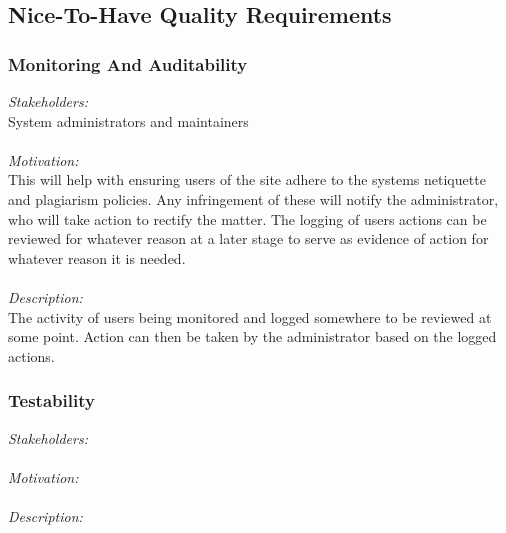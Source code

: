 \documentclass[a4paper,12pt]{report}
\begin{document}
	\subsection{Nice-To-Have Quality Requirements}
		\subsubsection{Monitoring And Auditability}
		\emph{Stakeholders: }\\ System administrators and maintainers\\
		\\\emph{Motivation: }\\ This will help with ensuring users of the site adhere to the systems netiquette and plagiarism policies. Any infringement of these will notify the administrator, who will take action to rectify the matter. The logging of users actions can be reviewed for whatever reason at a later stage to serve as evidence of action for whatever reason it is needed. \\
		\\\emph{Description: }\\ The activity of users being monitored and logged somewhere to be reviewed at some point. Action can then be taken by the administrator based on the logged actions. \\
			
		\subsubsection{Testability}
		\emph{Stakeholders: }\\ 
		\\\emph{Motivation: }\\
		\\\emph{Description: }\\
\end{document}
